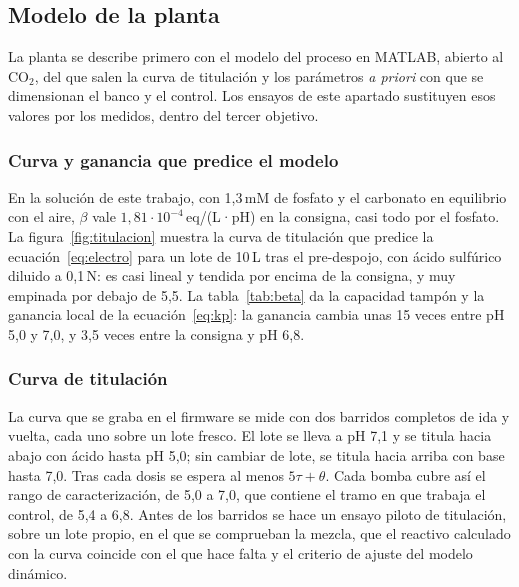 \subsection{Modelo de la planta}\label{sec:planta}

La planta se describe primero con el modelo del proceso en MATLAB, abierto al CO$_2$, del que salen la curva de titulación y los parámetros \emph{a priori} con que se dimensionan el banco y el control. Los ensayos de este apartado sustituyen esos valores por los medidos, dentro del tercer objetivo.

\subsubsection{Curva y ganancia que predice el modelo}
En la solución de este trabajo, con 1,3\,mM de fosfato y el carbonato en equilibrio con el aire, $\beta$ vale $1{,}81\cdot10^{-4}$\,eq/(L·pH) en la consigna, casi todo por el fosfato. La figura~\ref{fig:titulacion} muestra la curva de titulación que predice la ecuación~\eqref{eq:electro} para un lote de 10\,L tras el pre-despojo, con ácido sulfúrico diluido a 0,1\,N: es casi lineal y tendida por encima de la consigna, y muy empinada por debajo de 5,5. La tabla~\ref{tab:beta} da la capacidad tampón y la ganancia local de la ecuación~\eqref{eq:kp}: la ganancia cambia unas 15 veces entre pH 5,0 y 7,0, y 3,5 veces entre la consigna y pH 6,8.



\subsubsection{Curva de titulación}\label{sec:barridos}
La curva que se graba en el firmware se mide con dos barridos completos de ida y vuelta, cada uno sobre un lote fresco. El lote se lleva a pH 7,1 y se titula hacia abajo con ácido hasta pH 5,0; sin cambiar de lote, se titula hacia arriba con base hasta 7,0. Tras cada dosis se espera al menos $5\tau+\theta$. Cada bomba cubre así el rango de caracterización, de 5,0 a 7,0, que contiene el tramo en que trabaja el control, de 5,4 a 6,8. Antes de los barridos se hace un ensayo piloto de titulación, sobre un lote propio, en el que se comprueban la mezcla, que el reactivo calculado con la curva coincide con el que hace falta y el criterio de ajuste del modelo dinámico.

